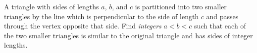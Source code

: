 A triangle with sides of lengths $a$, $b$, and $c$ is partitioned into two
smaller triangles by the line which is perpendicular to the side of length $c$
and passes through the vertex opposite that side. Find {\it integers} $a < b <
c$ such that each of the two smaller triangles is similar to the original
triangle and has sides of integer lengths.
